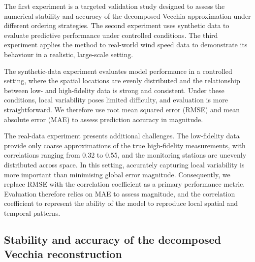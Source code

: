 \documentclass[12pt]{article}
\begin{document}
The first experiment is a targeted validation study designed to assess the numerical stability and accuracy of the decomposed Vecchia approximation under different  ordering strategies. The second experiment uses synthetic data to evaluate predictive performance under controlled conditions. The third experiment applies the method to real-world wind speed data to demonstrate its behaviour in a realistic, large-scale setting.










\noindent  
\hangindent=-5mm  


\noindent  
\hangindent=-5mm  
The synthetic-data experiment evaluates model performance in a controlled setting, where the spatial locations are evenly distributed and the relationship between low- and high-fidelity data is strong and consistent. Under these conditions, local variability poses limited difficulty, and evaluation is more straightforward. We therefore use root mean squared error (RMSE) and mean absolute error (MAE) to assess prediction accuracy in magnitude. 

\noindent  
\hangindent=-5mm  
The real-data experiment presents additional challenges. The low-fidelity data provide only coarse approximations of the true high-fidelity measurements, with correlations ranging from 0.32 to 0.55, and the monitoring stations are unevenly distributed across space. In this setting, accurately capturing local variability is more important than minimising global error magnitude. Consequently, we replace RMSE with the correlation coefficient as a primary performance metric. Evaluation therefore relies on MAE to assess magnitude,  and the correlation coefficient to represent the ability of the model to reproduce local spatial and temporal patterns.


\subsection{Stability and accuracy of the decomposed Vecchia reconstruction}
\end{document}
